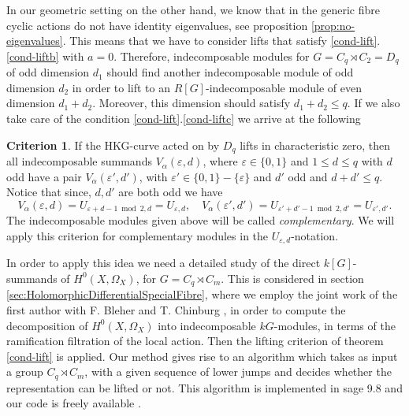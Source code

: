 \documentclass[11pt,letterpaper]{amsart}
\theoremstyle{definition}
\newtheorem{criterion}[theorem]{Criterion}
\renewcommand{\mod}{\bmod}
\begin{document}
In our geometric setting on the other hand, we know that in the generic fibre cyclic actions do not have identity eigenvalues, see proposition \ref{prop:no-eigenvalues}. This means that we have to consider lifts that satisfy \ref{cond-lift}.\ref{cond-liftb} with $a=0$. Therefore, indecomposable modules for $G=C_q \rtimes C_2 =D_q$ of odd dimension $d_1$ should find another indecomposable module of odd dimension $d_2$ in order to lift to an $R[G]$-indecomposable module of even dimension $d_1+d_2$. Moreover, this dimension should satisfy $d_1+d_2 \leq q$. If we also take care of the condition \ref{cond-lift}.\ref{cond-liftc} we arrive at the following

\begin{criterion}
\label{crit:main}
{If the HKG-curve  acted on by $D_q$ lifts in characteristic zero, then} all indecomposable summands $V_{\alpha}(\varepsilon,d)$, where $\varepsilon\in \{0,1\}$ and $1 \leq d \leq q$ with $d$ odd have a pair 
$V_\alpha (\varepsilon',d')$, with $\varepsilon' \in \{0,1\}- \{\varepsilon\}$ and $d'$ odd and  $d+d'\leq q$. 
Notice that since, $d,d'$ are both odd we have
\[
  V_{\alpha}(\varepsilon,d)=U_{\varepsilon+d-1 \mod 2,d} =
  U_{\varepsilon,d}, \quad V_{\alpha}(\varepsilon',d')=U_{\varepsilon'+d'-1 \mod 2,d'}=U_{\varepsilon',d'}. 
\]
The indecomposable modules given above will be called {\em complementary}. 
We will apply this criterion for complementary modules in the $U_{\varepsilon,d}$-notation. 
\end{criterion}
In order to apply this idea we need a detailed study of the direct $k[G]$-summands of $H^0(X,\Omega_X)$, for $G=C_q \rtimes C_m$. This is considered in section \ref{sec:HolomorphicDifferentialSpecialFibre}, where we employ the joint work of the first author with F. Bleher and T. Chinburg  \cite{MR4130074}, in order to compute the decomposition of $H^0(X,\Omega_X)$ into indecomposable $kG$-modules, in terms of the ramification filtration of the local action. 
Then the lifting criterion of theorem \ref{cond-lift} is applied. 
Our method gives rise to an algorithm which takes as input a group $C_q \rtimes C_m$, with a given sequence of lower jumps and decides whether 
the representation can be lifted or not. This algorithm is implemented in sage 9.8 \cite{sagemath9.8}  and our code is freely available \cite{CodeSage}.
\end{document}
